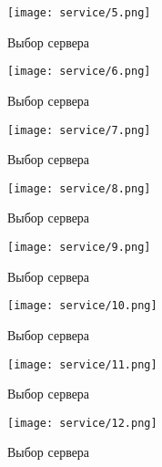 \begin{figure}[h!]
\center
	\texttt{[image: service/5.png]}
	\caption{Выбор сервера}
	\label{pict:projectserver}
\end{figure}

\begin{figure}[h!]
\center
	\texttt{[image: service/6.png]}
	\caption{Выбор сервера}
	\label{pict:projectserver}
\end{figure}

\begin{figure}[h!]
\center
	\texttt{[image: service/7.png]}
	\caption{Выбор сервера}
	\label{pict:projectserver}
\end{figure}
\begin{figure}[h!]
\center
	\texttt{[image: service/8.png]}
	\caption{Выбор сервера}
	\label{pict:projectserver}
\end{figure}
\begin{figure}[h!]
\center
	\texttt{[image: service/9.png]}
	\caption{Выбор сервера}
	\label{pict:projectserver}
\end{figure}
\begin{figure}[h!]
\center
	\texttt{[image: service/10.png]}
	\caption{Выбор сервера}
	\label{pict:projectserver}
\end{figure}
\begin{figure}[h!]
\center
	\texttt{[image: service/11.png]}
	\caption{Выбор сервера}
	\label{pict:projectserver}
\end{figure}
\begin{figure}[h!]
\center
	\texttt{[image: service/12.png]}
	\caption{Выбор сервера}
	\label{pict:projectserver}
\end{figure}

